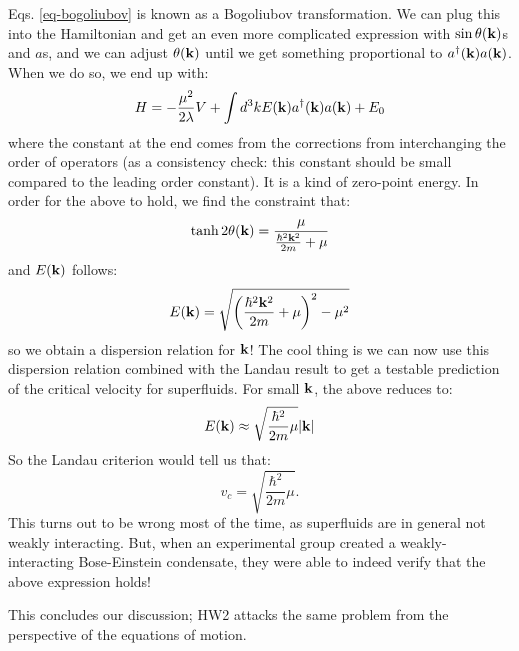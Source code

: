 Eqs. \eqref{eq-bogoliubov} is known as a Bogoliubov transformation. We can plug this into the Hamiltonian and get an even more complicated expression with $\sin\theta(\mathbf{k})$s and $a$s, and we can adjust $\theta(\mathbf{k})$ until we get something proportional to $a^\dagger(\mathbf{k})a(\mathbf{k})$. When we do so, we end up with:
\begin{equation}
    H = -\frac{\mu^2}{2\lambda}V + \int d^3k E(\mathbf{k})a^\dagger(\mathbf{k})a(\mathbf{k}) + E_0
\end{equation}
where the constant at the end comes from the corrections from interchanging the order of operators (as a consistency check: this constant should be small compared to the leading order constant). It is a kind of zero-point energy. In order for the above to hold, we find the constraint that:
\begin{equation}
    \tanh2\theta(\mathbf{k}) = \frac{\mu}{\frac{\hbar^2\mathbf{k}^2}{2m} + \mu}
\end{equation}
and $E(\mathbf{k})$ follows:
\begin{equation}
    E(\mathbf{k}) = \sqrt{\left(\frac{\hbar^2\mathbf{k}^2}{2m} + \mu\right)^2 - \mu^2}
\end{equation}
so we obtain a dispersion relation for $\mathbf{k}$! The cool thing is we can now use this dispersion relation combined with the Landau result to get a testable prediction of the critical velocity for superfluids. For small $\mathbf{k}$, the above reduces to:
\begin{equation}
    E(\mathbf{k}) \approx \sqrt{\frac{\hbar^2}{2m}\mu}\lvert \mathbf{k} \rvert
\end{equation}
So the Landau criterion would tell us that:
\begin{equation}
    v_c = \sqrt{\frac{\hbar^2}{2m}\mu}.
\end{equation}
This turns out to be wrong most of the time, as superfluids are in general not weakly interacting. But, when an experimental group created a weakly-interacting Bose-Einstein condensate, they were able to indeed verify that the above expression holds!

This concludes our discussion; HW2 attacks the same problem from the perspective of the equations of motion.

